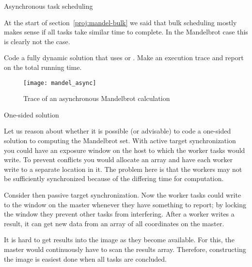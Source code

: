  {Asynchronous task scheduling}

At the start of section~\ref{proj:mandel-bulk} we said that bulk scheduling
mostly makes sense if all tasks take similar time to complete.
In the Mandelbrot case this is clearly not the case.

\begin{exercise}
  Code a fully dynamic solution that uses  or .
  Make an execution trace and report on the total running time.
\end{exercise}

\begin{figure}[ht]
\texttt{[image: mandel\_async]}
\caption{Trace of an asynchronous Mandelbrot calculation}
\label{fig:mandel-async}
\end{figure}

 {One-sided solution}

Let us reason about whether it is possible (or advisable) to code a
one-sided solution to computing the Mandelbrot set.  
%
With active
target synchronization you could have an exposure window on the host
to which the worker tasks would write. To prevent conflicts you would allocate an 
array and have each worker write to a separate location in it.
%
The problem here is that the workers may not be sufficiently synchronized because
of the differing time for computation.

Consider then passive target synchronization. Now the worker tasks could
write to the window on the master whenever they have something to
report; by locking the window they prevent other tasks from interfering.
%
After a worker writes a result, it can get new data from an array
of all coordinates on the master. 

It is hard to get results into the image as they become available. For
this, the master would continuously have to scan the results
array. Therefore, constructing the image is easiest done when all
tasks are concluded.
